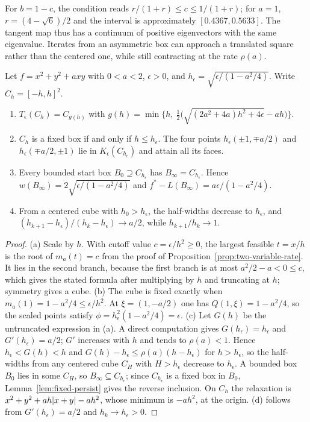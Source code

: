 For $b=1-c$, the condition reads $r/(1+r)\le c\le1/(1+r)$; for $a=1$,
$r=(4-\sqrt6)/2$ and the interval is approximately $[0.4367,0.5633]$. The tangent map thus has a continuum of positive
eigenvectors with the same eigenvalue. Iterates from an asymmetric box can
approach a translated square rather than the centered one, while still
contracting at the rate $\rho(a)$.

\begin{proposition}\label{prop:two-variable-cutoff-floor}
Let $f=x^2+y^2+axy$ with $0<a<2$, $\epsilon>0$, and
$h_\epsilon=\sqrt{\epsilon/(1-a^2/4)}$. Write $C_h=[-h,h]^2$.
\begin{enumerate}[label=(\alph*)]
\item $T_\epsilon(C_h)=C_{g(h)}$ with
  $g(h)=\min\bigl\{h,\ \tfrac12\bigl(\sqrt{(2a^2+4a)h^2+4\epsilon}-ah\bigr)\bigr\}$.
\item $C_h$ is a fixed box if and only if $h\le h_\epsilon$. The four points
  $h_\epsilon(\pm1,\mp a/2)$ and $h_\epsilon(\mp a/2,\pm1)$ lie in
  $K_\epsilon(C_{h_\epsilon})$ and attain all its faces.
\item Every bounded start box $B_0\supseteq C_{h_\epsilon}$ has
  $B_\infty=C_{h_\epsilon}$. Hence
  $w(B_\infty)=2\sqrt{\epsilon/(1-a^2/4)}$ and
  $f^*-L(B_\infty)=a\epsilon/(1-a^2/4)$.
\item From a centered cube with $h_0>h_\epsilon$, the half-widths decrease to
  $h_\epsilon$, and $(h_{k+1}-h_\epsilon)/(h_k-h_\epsilon)\to a/2$, while
  $h_{k+1}/h_k\to1$.
\end{enumerate}
\end{proposition}

\begin{proof}
(a) Scale by $h$. With cutoff value $c=\epsilon/h^2\ge0$, the largest
feasible $t=x/h$ is the root of $m_a(t)=c$ from the proof of
Proposition~\ref{prop:two-variable-rate}. It lies in the second branch,
because the first branch is at most $a^2/2-a<0\le c$, which gives the stated
formula after multiplying by $h$ and truncating at $h$; symmetry gives a
cube. (b) The cube is fixed exactly when $m_a(1)=1-a^2/4\le\epsilon/h^2$. At
$\xi=(1,-a/2)$ one has $Q(1,\xi)=1-a^2/4$, so the scaled points satisfy
$\phi=h_\epsilon^2(1-a^2/4)=\epsilon$. (c) Let $G(h)$ be the untruncated
expression in (a). A direct computation gives $G(h_\epsilon)=h_\epsilon$ and
$G'(h_\epsilon)=a/2$; $G'$ increases with $h$ and tends to $\rho(a)<1$. Hence
$h_\epsilon<G(h)<h$ and $G(h)-h_\epsilon\le\rho(a)(h-h_\epsilon)$ for
$h>h_\epsilon$, so the half-widths from any centered cube $C_H$ with
$H>h_\epsilon$ decrease to $h_\epsilon$. A bounded box $B_0$ lies in some
$C_H$, so $B_\infty\subseteq C_{h_\epsilon}$; since $C_{h_\epsilon}$ is a fixed
box in $B_0$, Lemma~\ref{lem:fixed-persist} gives the reverse inclusion. On
$C_h$ the relaxation is $x^2+y^2+ah\lvert x+y\rvert-ah^2$, whose minimum is
$-ah^2$, at the origin. (d) follows from $G'(h_\epsilon)=a/2$ and
$h_k\to h_\epsilon>0$.
\end{proof}

